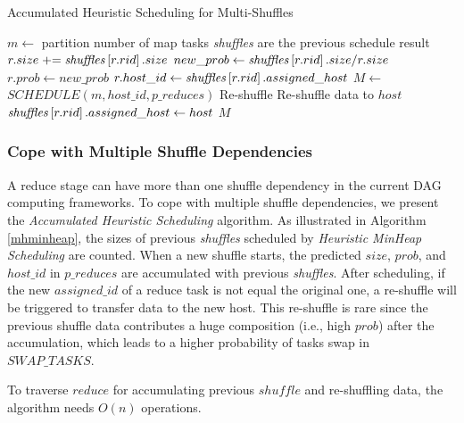 \begin{minipage}{0.95\columnwidth}
	\begin{algorithm}[H]
	\caption{Accumulated Heuristic Scheduling for Multi-Shuffles}
	\label{mhminheap}
		\begin{algorithmic}[1]
		\small
			\State $m\gets$ partition number of map tasks
			\Comment \textit{shuffles} are the previous schedule result 
				\State $r.size \mathrel{+}= \text{\textit{shuffles}}\left[r.rid\right].size$
				\State $new\_prob\gets \text{\textit{shuffles}}\left[r.rid\right].size / r.size$
					\State $r.prob\gets new\_prob$
					\State $r.host\_id\gets \text{\textit{shuffles}}\left[r.rid\right].assigned\_host$
				\EndIf
			\EndFor
			\State $M\gets$ $SCHEDULE\left(m, host\_id, p\_reduces\right)$
				\Comment Re-shuffle
					\State Re-shuffle data to $host$
					\State $\text{\textit{shuffles}}\left[r.rid\right].assigned\_host\gets host$
					\EndIf
				\EndFor
			\EndFor
			\Return $M$
		\EndProcedure
		\end{algorithmic}
	\end{algorithm}
\end{minipage}

\subsubsection{Cope with Multiple Shuffle Dependencies}
{\color{black}
A reduce stage can have more than one shuffle dependency in the current DAG computing frameworks.
To cope with multiple shuffle dependencies, we present the \textit{Accumulated Heuristic Scheduling} algorithm.
}
As illustrated in Algorithm \ref{mhminheap}, the sizes of previous \textit{shuffles} scheduled by \textit{Heuristic MinHeap Scheduling} are counted. 
When a new shuffle starts, the predicted $size$, $prob$, and $host\_id$ in $p\_reduces$ are accumulated with previous \textit{shuffles}. 
After scheduling, if the new $assigned\_id$ of a reduce task is not equal the original one, a re-shuffle will be triggered to transfer data to the new host. 
This re-shuffle is rare since the previous shuffle data contributes a huge composition (i.e., high $prob$) after the accumulation, 
which leads to a higher probability of tasks swap in $SWAP\_TASKS$. 

To traverse $reduce$ for accumulating previous $shuffle$ and re-shuffling data, the algorithm needs $O(n)$ operations.
